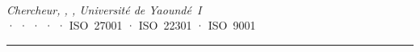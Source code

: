 \vspace{1.5ex}
\begin{center}
    {\small\bfseries\color{CouleurPrimaire}\auteurcours}\\[0.4ex]
    {\small\itshape\color{CouleurPrimaire}
        Chercheur, , , Université de Yaoundé~I}\\[0.3ex]
    {\footnotesize\color{CouleurPrimaire}
         ·  ·  ·  ·
         · ISO~27001 · ISO~22301 · ISO~9001}
    \\[0.8ex]
    {\color{CouleurAccent}\rule{0.6\linewidth}{1pt}}
\end{center}
